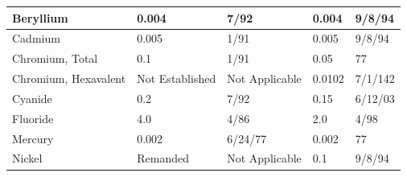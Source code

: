 \begin{table}[]
\begin{tabular}{|l|l|l|l|l|}
Beryllium                                 & 0.004                                                              & 7/92                                                                                         & 0.004                                                                   & 9/8/94                      \\ \hline
Cadmium                                   & 0.005                                                              & 1/91                                                                                         & 0.005                                                                   & 9/8/94                      \\ \hline
Chromium,   Total                         & 0.1                                                                & 1/91                                                                                         & 0.05                                                                    & 77                          \\ \hline
Chromium,   Hexavalent                    & Not   Established                                                  & Not   Applicable                                                                             & 0.0102                                                                  & 7/1/142                     \\ \hline
Cyanide                                   & 0.2                                                                & 7/92                                                                                         & 0.15                                                                    & 6/12/03                     \\ \hline
Fluoride                                  & 4.0                                                                & 4/86                                                                                         & 2.0                                                                     & 4/98                        \\ \hline
Mercury                                   & 0.002                                                              & 6/24/77                                                                                      & 0.002                                                                   & 77                          \\ \hline
Nickel                                    & Remanded                                                           & Not   Applicable                                                                             & 0.1                                                                     & 9/8/94                      \\ \hline

\end{tabular}
\end{table}
